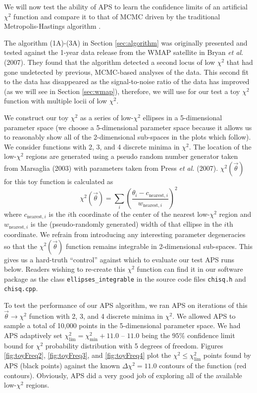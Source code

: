\documentclass[useAMS,usenatbib]{aastex}
\begin{document}
We will now test the ability of APS to learn the confidence limits of an
artificial $\chi^2$ function and compare it to that of MCMC driven by the
traditional Metropolis-Hastings algorithm \cite{mcmc,cosmomc}.

The algorithm (1A)-(3A) in Section \ref{sec:algorithm} 
was originally presented and tested against the 1-year data
release from the WMAP satellite in Bryan {\it et al}. (2007).  They found that
the algorithm detected a second locus of low $\chi^2$
that had gone undetected by previous, MCMC-based analyses of the data.  
This second fit to the data has disappeared as the signal-to-noise
ratio of the data has improved (as we will see in Section \ref{sec:wmap}),
therefore, we will use for our test a toy $\chi^2$ function
with multiple locii of low $\chi^2$.  

We construct our toy $\chi^2$ as a series of low-$\chi^2$ ellipses in a 5-dimensional
parameter space (we choose a 5-dimensional parameter space because it allows us to
reasonably show all of the 2-dimensional sub-spaces in the plots which follow).
We consider functions with 2, 3, and 4 discrete minima in $\chi^2$.
The location of the low-$\chi^2$ regions are generated using a pseudo random number
generator taken from Marsaglia (2003) with parameters taken from Press {\it et al.} (2007).
$\chi^2(\vec{\theta})$ for this toy function is calculated as 
\begin{equation}
\label{eqn:toychi}
\chi^2(\vec{\theta})=
\sum_i\left(\frac{\theta_i-c_{\text{nearest},i}}{w_{\text{nearest},i}}\right)^2
\end{equation}
where $c_{\text{nearest},i}$ is the $i$th coordinate of the center of the nearest low-$\chi^2$
region and $w_{\text{nearest},i}$ is the (pseudo-randomly generated) width of that ellipse in
the $i$th coordinate.  We refrain from introducing any interesting parameter degeneracies so
that the $\chi^2(\vec{\theta})$ function remains integrable in 2-dimensional sub-spaces.
This gives us a hard-truth ``control'' against which to evaluate our test APS runs below.
Readers wishing to re-create this $\chi^2$ function can find it in our software
package as the class \verb|ellipses_integrable| in the source code files \verb|chisq.h| and
\verb|chisq.cpp|.

To test the performance of our APS algorithm, we ran APS on iterations of this
$\vec{\theta}\rightarrow\chi^2$ function with 2, 3, and 4 discrete minima in $\chi^2$.  We
allowed APS to sample a total of 10,000 points in the 5-dimensional parameter space.  
We had APS adaptively set $\chi^2_\text{lim}=\chi^2_\text{min}+11.0$ -- $11.0$ being the $95\%$
confidence limit bound for $\chi^2$ probability distribution with 5 degrees of freedom.
Figures
\ref{fig:toyFreq2}, \ref{fig:toyFreq3}, and \ref{fig:toyFreq4} plot the
$\chi^2\le\chi^2_\text{lim}$ points found by APS (black points) against the
known $\Delta\chi^2=11.0$ contours of the function (red contours).  Obviously, APS did a very
good job of exploring all of the available low-$\chi^2$ regions.
\end{document}
